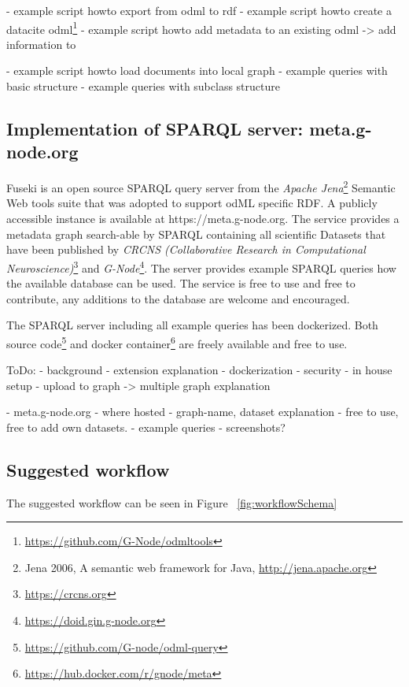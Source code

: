 \documentclass{article}
\begin{document}
- example script howto export from odml to rdf
- example script howto create a datacite odml\footnote{\url{https://github.com/G-Node/odmltools}}
- example script howto add metadata to an existing odml -> add information to

- example script howto load documents into local graph
- example queries with basic structure
- example queries with subclass structure

\subsection{Implementation of SPARQL server: meta.g-node.org} \label{sec:odml_query}

Fuseki is an open source SPARQL query server from the \textit{Apache Jena}\footnote{Jena 2006, A semantic web framework for Java, \url{http://jena.apache.org}} Semantic Web tools suite that was adopted to support odML specific RDF. A publicly accessible instance is available at https://meta.g-node.org. The service provides a metadata graph search-able by SPARQL containing all scientific Datasets that have been published by \textit{CRCNS (Collaborative Research in Computational Neuroscience)}\footnote{\url{https://crcns.org}} and \textit{G-Node}\footnote{\url{https://doid.gin.g-node.org}}. The server provides example SPARQL queries how the available database can be used. The service is free to use and free to contribute, any additions to the database are welcome and encouraged.

The SPARQL server including all example queries has been dockerized. Both source code\footnote{\url{https://github.com/G-node/odml-query}} and docker container\footnote{\url{https://hub.docker.com/r/gnode/meta}} are freely available and free to use.

ToDo:
- background
- extension explanation
- dockerization
- security
- in house setup
- upload to graph -> multiple graph explanation

- meta.g-node.org
  - where hosted
  - graph-name, dataset explanation
  - free to use, free to add own datasets.
  - example queries
  - screenshots?

\subsection{Suggested workflow} \label{sec:odml_rdf_workflow}

The suggested workflow can be seen in Figure ~\ref{fig:workflowSchema}
\end{document}
